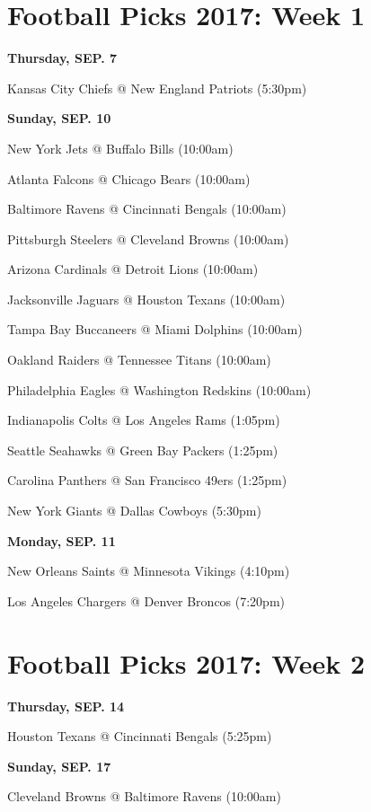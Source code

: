 \documentclass[11pt, letterpaper]{article}
\begin{document}
\setlength{\parindent}{0.5em}
\setlength{\parskip}{1.4em}

\newpage \section*{\LARGE Football Picks 2017: Week 1}
\noindent \normalsize \textbf{Thursday, SEP. 7} \par
Kansas City Chiefs @ New England Patriots (5:30pm)\par
\noindent \normalsize \textbf{Sunday, SEP. 10} \par
New York Jets @ Buffalo Bills (10:00am)\par
Atlanta Falcons @ Chicago Bears (10:00am)\par
Baltimore Ravens @ Cincinnati Bengals (10:00am)\par
Pittsburgh Steelers @ Cleveland Browns (10:00am)\par
Arizona Cardinals @ Detroit Lions (10:00am)\par
Jacksonville Jaguars @ Houston Texans (10:00am)\par
Tampa Bay Buccaneers @ Miami Dolphins (10:00am)\par
Oakland Raiders @ Tennessee Titans (10:00am)\par
Philadelphia Eagles @ Washington Redskins (10:00am)\par
Indianapolis Colts @ Los Angeles Rams (1:05pm)\par
Seattle Seahawks @ Green Bay Packers (1:25pm)\par
Carolina Panthers @ San Francisco 49ers (1:25pm)\par
New York Giants @ Dallas Cowboys (5:30pm)\par
\noindent \normalsize \textbf{Monday, SEP. 11} \par
New Orleans Saints @ Minnesota Vikings (4:10pm)\par
Los Angeles Chargers @ Denver Broncos (7:20pm)\par
\newpage \section*{\LARGE Football Picks 2017: Week 2}
\noindent \normalsize \textbf{Thursday, SEP.    14} \par
Houston Texans @ Cincinnati Bengals (5:25pm)\par
\noindent \normalsize \textbf{Sunday, SEP. 17} \par
Cleveland Browns @ Baltimore Ravens (10:00am)\par
\end{document}
